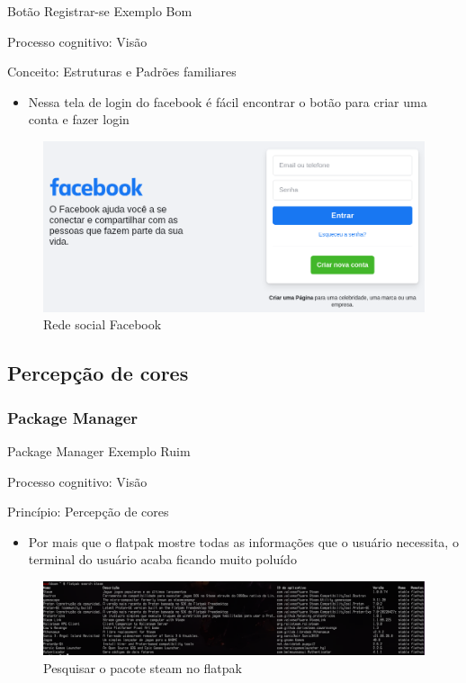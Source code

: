 \documentclass{beamer}
\begin{document}
\begin{frame}{Botão Registrar-se Exemplo Bom}

Processo cognitivo: Visão

Conceito: Estruturas e Padrões familiares

\begin{itemize}
    \item Nessa tela de login do facebook é fácil encontrar o botão para criar uma conta e fazer login
\end{itemize}
\begin{figure}
    \centering
    \includegraphics[scale=0.3]{images/Facebook-Login.png}
    \caption{Rede social Facebook}
\end{figure}

\end{frame}

\subsection{Percepção de cores}
\subsubsection{Package Manager}

\begin{frame}{Package Manager Exemplo Ruim}

Processo cognitivo: Visão

Princípio: Percepção de cores

\begin{itemize}
    \item Por mais que o flatpak mostre todas as informações que o usuário necessita, o terminal do usuário acaba ficando muito poluído
\end{itemize}
\begin{figure}
    \centering
    \includegraphics[scale=0.2]{images/Flatpak-Search.png}
    \caption{Pesquisar o pacote steam no flatpak}
\end{figure}

\end{frame}
\end{document}
